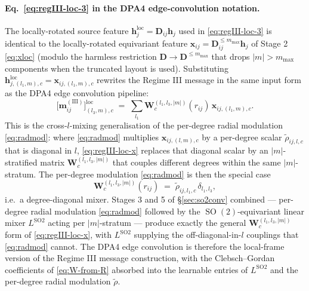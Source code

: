 \documentclass[11pt,a4paper]{article}
\DeclareMathOperator{\SO}{SO}
\newcommand{\bx}{\bm{x}}
\newcommand{\bh}{\bm{h}}
\newcommand{\bD}{\bm{D}}
\newcommand{\mmax}{m_{\max}}
\theoremstyle{plain}
\theoremstyle{definition}
\theoremstyle{remark}
\begin{document}
    \paragraph{Eq.~\eqref{eq:regIII-loc-3} in the DPA4 edge-convolution notation.} The locally-rotated source feature
$\bh^{\mathrm{loc}}_j=\bD_{ij}\bh_j$ used in \eqref{eq:regIII-loc-3} is
    identical to the locally-rotated equivariant feature
$\bx_{ij}=\bD^{\le\mmax}_{ij}\bh_j$ of Stage 2 \eqref{eq:xloc} (modulo the
    harmless restriction $\bD\to\bD^{\le\mmax}$ that drops $|m|>\mmax$ components
    when the truncated layout is used). Substituting
$\bh^{\mathrm{loc}}_{j,(l_1,m),c}=\bx_{ij,(l_1,m),c}$ rewrites the Regime III
    message in the same input form as the DPA4 edge convolution pipeline:
    \begin{equation}\label{eq:regIII-loc-x}
        \bigl[\bm{m}_{ij}^{\mathrm{(III)}}\bigr]^{\mathrm{loc}}_{(l_3,m),c}\;=\;\sum_{l_1}\bm{W}^{(l_1,l_3,|m|)}_c(r_{ij})\,\bx_{ij,(l_1,m),c}.
    \end{equation}
    This is the cross-$l$-mixing generalisation of the per-degree radial modulation \eqref{eq:radmod}: where \eqref{eq:radmod} multiplies $\bx_{ij,(l,m),c}$ by a per-degree scalar $\widetilde\rho_{ij,l,c}$ that is diagonal in $l$, \eqref{eq:regIII-loc-x} replaces that diagonal scalar by an $|m|$-stratified matrix $\bm{W}^{(l_1,l_3,|m|)}_c$ that couples different degrees within the same $|m|$-stratum.
    The per-degree modulation \eqref{eq:radmod} is then the special case
    \begin{equation}\label{eq:radmod-as-W}
        \bm{W}^{(l_1,l_3,|m|)}_c(r_{ij})\;=\;\widetilde\rho_{ij,l_1,c}\,\delta_{l_1,l_3},
    \end{equation}
    i.e.\ a degree-diagonal mixer.
    Stages 3 and 5 of \S\ref{sec:so2conv} combined --- per-degree radial modulation \eqref{eq:radmod} followed by the $\SO(2)$-equivariant linear mixer $L^{\mathrm{SO2}}$ acting per $|m|$-stratum --- produce exactly the general $\bm{W}^{(l_1,l_3,|m|)}_c$ form of \eqref{eq:regIII-loc-x}, with $L^{\mathrm{SO2}}$ supplying the off-diagonal-in-$l$ couplings that \eqref{eq:radmod} cannot.
    The DPA4 edge convolution is therefore the local-frame version of the Regime III message construction, with the Clebsch--Gordan coefficients of \eqref{eq:W-from-R} absorbed into the learnable entries of $L^{\mathrm{SO2}}$ and the per-degree radial modulation $\widetilde\rho$.
\end{document}
